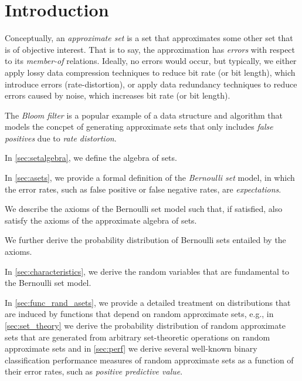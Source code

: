 \documentclass[ ../main.tex]{subfiles}
\begin{document}
\section{Introduction}



Conceptually, an \emph{approximate set} is a set that approximates some other set that is of objective interest.
That is to say, the approximation has \emph{errors} with respect to its \emph{member-of} relations.
Ideally, no errors would occur, but typically, we either apply lossy data compression techniques to reduce bit rate (or bit length), which introduce errors (rate-distortion), or apply data redundancy techniques to reduce errors caused by noise, which increases bit rate (or bit length).

The \emph{Bloom filter} is a popular example of a data structure and algorithm that models the concpet of generating approximate sets that only includes \emph{false positives} due to \emph{rate distortion}.

In \cref{sec:setalgebra}, we define the algebra of sets.

In \cref{sec:asets}, we provide a formal definition of the \emph{Bernoulli set} model, in which the error rates, such as false positive or false negative rates, are \emph{expectations}.

We describe the axioms of the Bernoulli set model such that, if satisfied, also satisfy the axioms of the approximate algebra of sets.

We further derive the probability distribution of Bernoulli sets entailed by the axioms.

In \cref{sec:characteristics}, we derive the random variables that are fundamental to the Bernoulli set model.

In \cref{sec:func_rand_asets}, we provide a detailed treatment on distributions that are induced by functions that depend on random approximate sets, e.g., in \cref{sec:set_theory} we derive the probability distribution of random approximate sets that are generated from arbitrary set-theoretic operations on random approximate sets and in \cref{sec:perf} we derive several well-known binary classification performance measures of random approximate sets as a function of their error rates, such as \emph{positive predictive value}.
\end{document}
